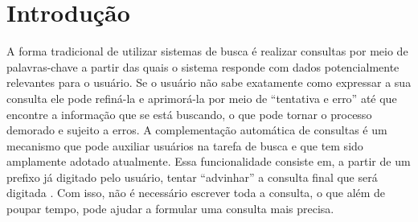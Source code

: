 \cleardoublepage
\chapter{Introdução}

A forma tradicional de utilizar sistemas de busca é realizar consultas por meio de palavras-chave a partir das quais o sistema responde com dados potencialmente relevantes para o usuário. Se o usuário não sabe exatamente como expressar a sua consulta ele pode refiná-la e aprimorá-la por meio de ``tentativa e erro'' até que encontre a informação que se está buscando, o que pode tornar o processo demorado e sujeito a erros. A complementação automática de consultas é um mecanismo que pode auxiliar usuários na tarefa de busca e que tem sido amplamente adotado atualmente. Essa funcionalidade consiste em, a partir de um prefixo já digitado pelo usuário, tentar ``advinhar'' a consulta final que será digitada \citep{santo2015}. Com isso, não é necessário escrever toda a consulta, o que além de poupar tempo, pode ajudar a formular uma consulta mais precisa.

